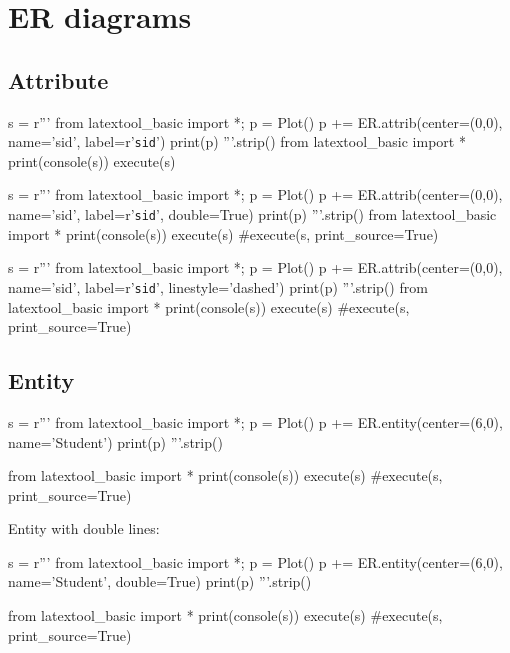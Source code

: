 \section{ER diagrams}

\subsection{Attribute}

\begin{python}
s = r'''
from latextool_basic import *; p = Plot()
p += ER.attrib(center=(0,0), name='sid', label=r'\texttt{sid}')
print(p)
'''.strip()
from latextool_basic import *
print(console(s))
execute(s)
\end{python}

\begin{python}
s = r'''
from latextool_basic import *; p = Plot()
p += ER.attrib(center=(0,0), name='sid', label=r'\texttt{sid}',
               double=True)
print(p)
'''.strip()
from latextool_basic import *
print(console(s))
execute(s)
#execute(s, print_source=True)
\end{python}

\begin{python}
s = r'''
from latextool_basic import *; p = Plot()
p += ER.attrib(center=(0,0), name='sid', label=r'\texttt{sid}', linestyle='dashed')
print(p)
'''.strip()
from latextool_basic import *
print(console(s))
execute(s)
#execute(s, print_source=True)
\end{python}



\newpage
\subsection{Entity}

\begin{python}
s = r'''
from latextool_basic import *; p = Plot()
p += ER.entity(center=(6,0), name='Student')
print(p)
'''.strip()

from latextool_basic import *
print(console(s))
execute(s)
#execute(s, print_source=True)
\end{python}

Entity with double lines:
\begin{python}
s = r'''
from latextool_basic import *; p = Plot()
p += ER.entity(center=(6,0), name='Student', double=True)
print(p)
'''.strip()

from latextool_basic import *
print(console(s))
execute(s)
#execute(s, print_source=True)
\end{python}


